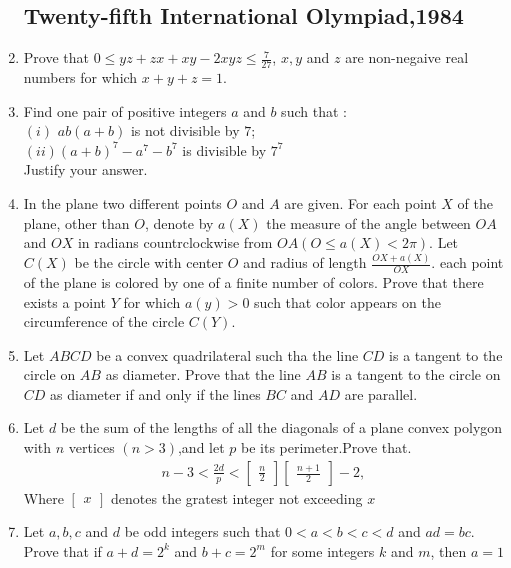 \documentclass[12pt,-letter paper]{article}
\providecommand{\myvec}[1]{\ensuremath{\begin{bmatrix}#1\end{bmatrix}}}
\providecommand{\brak}[1]{\ensuremath{\left(#1\right)}}
\begin{document}
\begin{enumerate}


		\subsection*{Twenty-fifth International Olympiad,1984}
\item Prove that $0 \leq yz+zx+xy-2xyz \leq \frac{7}{27}$, $x,y$ and $z$ are non-negaive real numbers for which $x+y+z=1$.
\item Find one pair of positive integers $a$ and $b$ such that :\\
	$\brak{i}$ $ab\brak{a+b}$ is not divisible by $7$;\\
		$\brak{ii}$$\brak{a+b}^7-a^7-b^7$ is divisible by $7^7$\\
		Justify your answer.
	\item In the plane two different points $O$ and $A$ are given. For each point $X$ of the plane, other than $O$, denote by $a\brak{X}$ the measure of the angle between $OA$ and $OX$ in radians countrclockwise from $OA\brak {O\leq a\brak{X}<2\pi}$. Let $C\brak{X}$ be the circle with center $O$ and radius of length $\frac {OX+a\brak{X}}{OX}$. each point  of the plane is colored by one of a finite number of colors. Prove that there exists a point $Y$ for which $a\brak{y}>0$ such that color appears on  the circumference of the circle $C\brak{Y}$.
\item Let $ABCD$ be a convex quadrilateral such tha the line $CD$ is a tangent to the circle on $AB$ as diameter. Prove that the line $AB$ is a tangent to the  circle on $CD$ as diameter if and only if the lines $BC$ and $AD$ are parallel.
\item Let $d$ be the sum of the lengths of all the diagonals of a plane convex polygon with $n$ vertices $\brak{n>3}$,and let $p$ be its perimeter.Prove that.\begin{align*}
n-3<\frac{2d}{p}<\myvec{\frac{n}{2}}\myvec{\frac{n+1}{2}}-2,\end{align*} 
		Where $\myvec{x}$ denotes the gratest integer not exceeding $x$
\item Let $a,b,c$ and $d$ be odd integers such that  $0<a<b<c<d$ and $ad=bc$. Prove that if $a+d=2^k$ and $b+c=2^m$ for some integers $k$ and $m$, then $a=1$ 	


\end{enumerate}
\end{document}
